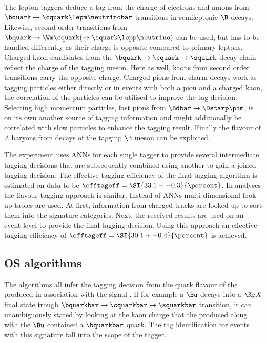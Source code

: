 The lepton taggers deduce a tag from the charge of electrons and muons from
$\bquark \to \cquark \lepm \neutrinobar$ transitions in semileptonic $\B$
decays. Likewise, second order transitions from $\bquark \to \Wm \cquark ( \to
\squark \lepp \neutrino )$ can be used, but has to be handled differently as
their charge is opposite compared to primary leptons. Charged kaon candidates
from the $\bquark \to \cquark \to \squark$ decay chain reflect the charge of the
tagging meson. Here as well, kaons from second order transitions carry the
opposite charge. Charged pions from charm decays work as tagging particles
either directly or in events with both a pion and a charged kaon, the
correlation of the particles can be utilised to improve the tag decision.
Selecting high momentum particles, \eg fast pions from $\Bdbar \to \Dstarp
\pim$, is on its own another source of tagging information and might
additionally be correlated with slow particles to enhance the tagging result.
Finally the flavour of $\Lambda$ baryons from decays of the tagging $\B$ meson
can be exploited.

The \Babar experiment uses \acp{ANN} for each single tagger to provide several
intermediate tagging decisions that are subsequently combined using another \ANN
to gain a joined tagging decision. The effective tagging efficiency of the final
\Babar tagging algorithm is estimated on data to be $\efftageff = \SI{33.1 +-
0.3}{\percent}$. In \Belle analyses the flavour tagging approach is similar.
Instead of \acp{ANN} multi-dimensional look-up tables are used. At first,
information from charged tracks are looked-up to sort them into the signature
categories. Next, the received results are used on an event-level to provide the
final tagging decision. Using this approach an effective tagging efficiency of
$\efftageff = \SI{30.1 +- 0.4}{\percent}$ is achieved.

\subsection{\Acl{OS} algorithms}
\label{sec:flavour_tagging:os}
The \OS algorithms all infer the tagging decision from the quark flavour of the
\bhadron produced in association with the signal \Bmeson. If for example a $\Bu$
decays into a $\Kp X$ final state trough $\bquarkbar \to \cquarkbar \to
\squarkbar$ transition, it can unambiguously stated by looking at the kaon
charge that the \bhadron produced along with the $\Bu$ contained a $\bquarkbar$
quark. The tag identification for events with this signature fall into the scope
of the \OSK tagger.

